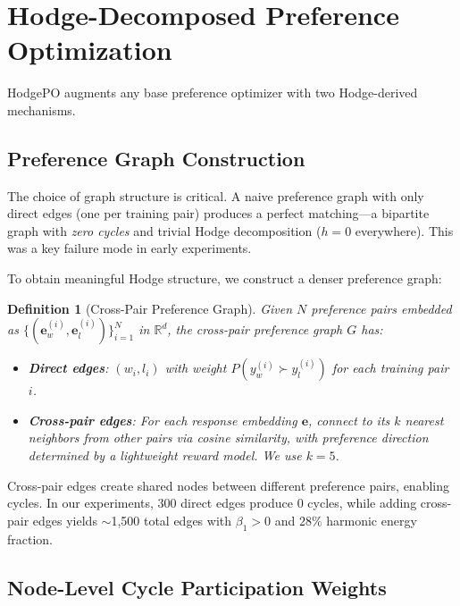 \documentclass{article}
\newtheorem{definition}{Definition}
\begin{document}
\section{Hodge-Decomposed Preference Optimization}
\label{sec:method}

HodgePO augments any base preference optimizer with two Hodge-derived mechanisms.

\subsection{Preference Graph Construction}
\label{sec:graph_construction}

The choice of graph structure is critical. A naive preference graph with only direct edges (one per training pair) produces a perfect matching---a bipartite graph with \emph{zero cycles} and trivial Hodge decomposition ($h = 0$ everywhere). This was a key failure mode in early experiments.

To obtain meaningful Hodge structure, we construct a denser preference graph:

\begin{definition}[Cross-Pair Preference Graph]
Given $N$ preference pairs embedded as $\{(\mathbf{e}_w^{(i)}, \mathbf{e}_l^{(i)})\}_{i=1}^N$ in $\mathbb{R}^d$, the cross-pair preference graph $G$ has:
\begin{itemize}
    \item \textbf{Direct edges}: $(w_i, l_i)$ with weight $P(y_w^{(i)} \succ y_l^{(i)})$ for each training pair $i$.
    \item \textbf{Cross-pair edges}: For each response embedding $\mathbf{e}$, connect to its $k$ nearest neighbors from \emph{other} pairs via cosine similarity, with preference direction determined by a lightweight reward model. We use $k = 5$.
\end{itemize}
\end{definition}

Cross-pair edges create shared nodes between different preference pairs, enabling cycles. In our experiments, 300 direct edges produce 0 cycles, while adding cross-pair edges yields $\sim$1,500 total edges with $\beta_1 > 0$ and $28\%$ harmonic energy fraction.

\subsection{Node-Level Cycle Participation Weights}
\end{document}
